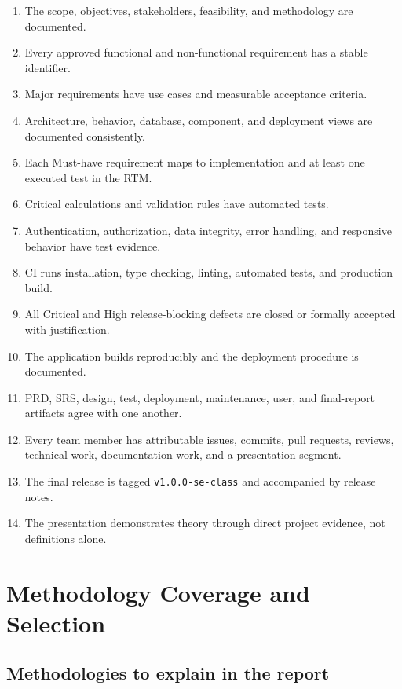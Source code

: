 \documentclass[
  10pt,
  a4paper,
  oneside]{report}
\providecommand{\tightlist}{%
  \setlength{\itemsep}{0pt}\setlength{\parskip}{0pt}}
\begin{document}
\begin{enumerate}
\def\labelenumi{\arabic{enumi}.}
\tightlist
\item
  The scope, objectives, stakeholders, feasibility, and methodology are
  documented.
\item
  Every approved functional and non-functional requirement has a stable
  identifier.
\item
  Major requirements have use cases and measurable acceptance criteria.
\item
  Architecture, behavior, database, component, and deployment views are
  documented consistently.
\item
  Each Must-have requirement maps to implementation and at least one
  executed test in the RTM.
\item
  Critical calculations and validation rules have automated tests.
\item
  Authentication, authorization, data integrity, error handling, and
  responsive behavior have test evidence.
\item
  CI runs installation, type checking, linting, automated tests, and
  production build.
\item
  All Critical and High release-blocking defects are closed or formally
  accepted with justification.
\item
  The application builds reproducibly and the deployment procedure is
  documented.
\item
  PRD, SRS, design, test, deployment, maintenance, user, and
  final-report artifacts agree with one another.
\item
  Every team member has attributable issues, commits, pull requests,
  reviews, technical work, documentation work, and a presentation
  segment.
\item
  The final release is tagged \texttt{v1.0.0-se-class} and accompanied
  by release notes.
\item
  The presentation demonstrates theory through direct project evidence,
  not definitions alone.
\end{enumerate}

\chapter{Methodology Coverage and
Selection}\label{6-methodology-coverage-and-selection}

\section{Methodologies to explain in the
report}\label{61-methodologies-to-explain-in-the-report}
\end{document}
